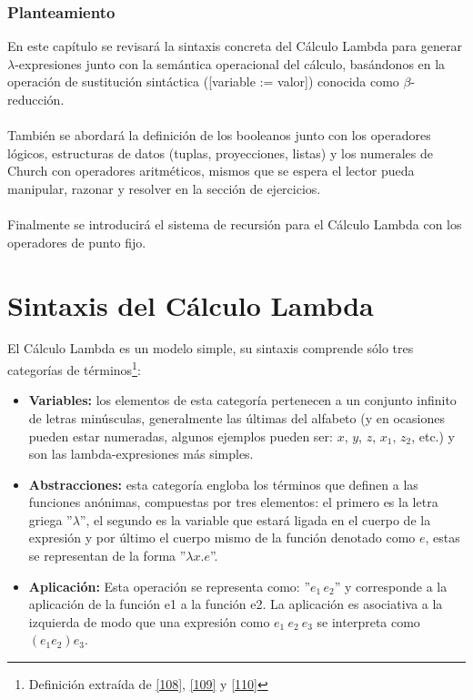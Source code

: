 \subsubsection{Planteamiento}
En este capítulo se revisará la sintaxis concreta del Cálculo Lambda para generar $\lambda$-expresiones junto con
la semántica operacional del cálculo, basándonos en la operación de sustitución sintáctica ([variable := valor]) conocida como $\beta$-reducción.\\\\
También se abordará la definición de los booleanos junto con los operadores lógicos, estructuras de datos (tuplas, proyecciones, listas) y los numerales de Church con operadores aritméticos, mismos que se espera el lector pueda manipular, razonar y resolver en la sección de ejercicios. \\\\
Finalmente se introducirá el sistema de recursión para el Cálculo Lambda con los operadores de punto fijo.


\section{Sintaxis del Cálculo Lambda}
    El Cálculo Lambda es un modelo simple, su sintaxis comprende sólo tres categorías de términos\footnote{Definición extraída de \hyperlink{108}{[108]},  \hyperlink{109}{[109]} y \hyperlink{110}{[110]}}:
    \begin{itemize}
        \item \textbf{Variables:} los elementos de esta categoría pertenecen a un conjunto infinito de letras minúsculas, generalmente las últimas del alfabeto (y en ocasiones pueden estar numeradas, algunos ejemplos pueden ser: $x$, $y$, $z$, $x_1$, $z_2$, etc.) y son las lambda-expresiones más simples.\\
        \item \textbf{Abstracciones:} esta categoría engloba los términos que definen a las funciones anónimas, compuestas por tres elementos: el primero es la letra griega ''$\lambda$'', el segundo es la variable que estará ligada en el cuerpo de la expresión y por último el cuerpo mismo de la función denotado como $e$, estas se representan de la forma ''$\lambda x.e$''.\\
        \item \textbf{Aplicación:} Esta operación se representa como: ''$e_1\,e_2$'' y corresponde a la aplicación de la función e1 a la función e2. La aplicación es asociativa a la izquierda de modo que una expresión como $e_1\ e_2\ e_3 $ se interpreta como $(e_1 e_2) e_3$.
    \end{itemize}

